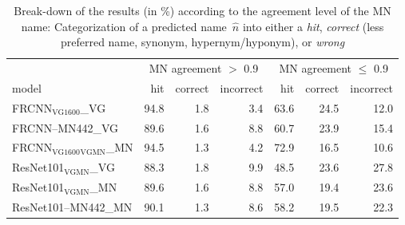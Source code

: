 \begin{table}[t]
\centering
	\small
\begin{tabular}{lrrr||rrr}
\toprule
&  \multicolumn{3}{c||}{MN agreement $>$ 0.9} & \multicolumn{3}{c}{MN agreement $\leq$ 0.9}\\
                  model &  hit &  correct &  incorrect &  hit &  correct &  incorrect \\
\midrule
       FRCNN$_{\text{VG1600}}$\_VG &      94.8 &           1.8 &             3.4 &     63.6 &         24.5 &           12.0 \\
        FRCNN--MN442\_VG &      89.6 &           1.6 &             8.8 &     60.7 &         23.9 &           15.4 \\
        		\midrule \midrule
 FRCNN$_{\text{VG1600}}$$_{\text{VGMN}}$\_MN &      94.5 &           1.3 &             4.2 &     72.9 &         16.5 &           10.6 \\
 		\midrule 
     ResNet101$_{\text{VGMN}}$\_VG &      88.3 &           1.8 &             9.9 &     48.5 &         23.6 &           27.8 \\
     ResNet101$_{\text{VGMN}}$\_MN &      89.6 &           1.6 &             8.8 &     57.0 &         19.4 &           23.6 \\
    ResNet101--MN442\_MN &      90.1 &           1.3 &             8.6 &     58.2 &         19.5 &           22.3 \\
\bottomrule

\end{tabular}
\caption{Break-down of the results (in \%) according to the agreement level of the MN name: Categorization of a predicted name\ $\hat{n}$ into either a \textit{hit}, \textit{correct} (less preferred name, synonym, hypernym/hyponym), or \textit{wrong} \label{tab:exp_errors_agreement}}
\end{table}



